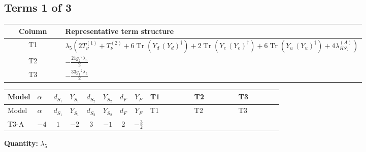 \documentclass[8pt]{article}
\begin{document}
\begin{landscape}
\subsection*{Terms 1 of 3}
\begin{center}
\begin{tabular}{@{}c >{\raggedright\arraybackslash}p{0.82\linewidth}@{}}
\toprule
Column & Representative term structure \\
\midrule
T1 & \(\displaystyle {\lambda_5} (2 T_{\nu}^{(1)}+T_{\nu}^{(2)}+6 \operatorname{Tr}\!\left({Y_d}\,\left({Y_d}\right)^{\dagger}\right)+2 \operatorname{Tr}\!\left({Y_e}\,\left({Y_e}\right)^{\dagger}\right)+6 \operatorname{Tr}\!\left({Y_u}\,\left({Y_u}\right)^{\dagger}\right)+4 {\lambda_{HS_2}^{(A)}})\) \\
\midrule
T2 & \(\displaystyle -\frac{21 {g_2}^2 {\lambda_5}}{2}\) \\
\midrule
T3 & \(\displaystyle -\frac{33 {g_1}^2 {\lambda_5}}{2}\) \\
\midrule
\bottomrule
\end{tabular}
\end{center}
\smallskip
\tiny
\begin{longtable}{@{}llcccccc >{\raggedright\arraybackslash}p{0.21\linewidth} >{\raggedright\arraybackslash}p{0.21\linewidth} >{\raggedright\arraybackslash}p{0.21\linewidth}@{}}
\toprule
Model & $\alpha$ & $d_{S_1}$ & $Y_{S_1}$ & $d_{S_2}$ & $Y_{S_2}$ & $d_F$ & $Y_F$ & T1 & T2 & T3 \\
\midrule
\endfirsthead
\toprule
Model & $\alpha$ & $d_{S_1}$ & $Y_{S_1}$ & $d_{S_2}$ & $Y_{S_2}$ & $d_F$ & $Y_F$ & T1 & T2 & T3 \\
\midrule
\endhead
T3-A & $-4$ & $1$ & $-2$ & $3$ & $-1$ & $2$ & $-\frac{3}{2}$ & \scriptsize\adjustbox{max width=\linewidth}{$\begin{gathered} {\lambda_5} (2 T_{\nu}^{(1)}+T_{\nu}^{(2)}+6 \operatorname{Tr}\!\left({Y_d}\,\left({Y_d}\right)^{\dagger}\right)+2 \operatorname{Tr}\!\left({Y_e}\,\left({Y_e}\right)^{\dagger}\right)+6 \operatorname{Tr}\!\left({Y_u}\,\left({Y_u}\right)^{\dagger}\right)+4 {\lambda_{HS_2}^{(A)}})\end{gathered}$} & \scriptsize\adjustbox{max width=\linewidth}{$\begin{gathered} -\frac{21 {g_2}^2 {\lambda_5}}{2}\end{gathered}$} & \scriptsize\adjustbox{max width=\linewidth}{$\begin{gathered} -\frac{33 {g_1}^2 {\lambda_5}}{2}\end{gathered}$} \\
\midrule
\bottomrule
\end{longtable}
\clearpage
\noindent\textbf{Quantity: }$\lambda_5$\par\smallskip

\end{landscape}
\end{document}
